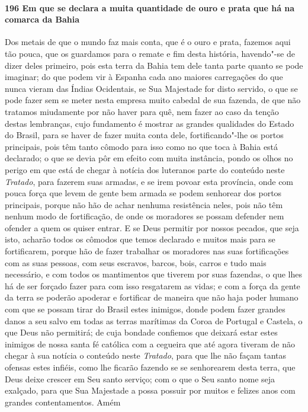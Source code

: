 \begin{linenumbers}
\paragraph{196 Em que se declara a muita quantidade de ouro e prata que há na comarca da
Bahia}\quad
Dos metais de que o mundo faz mais conta, que é o ouro e prata, fazemos aqui tão pouca,
que os guardamos para o remate e fim desta história, havendo"-se de dizer deles primeiro,
pois esta terra da Bahia tem dele tanta parte quanto se pode imaginar; do que podem vir à
Espanha cada ano maiores carregações do que nunca vieram das Índias Ocidentais, se Sua
Majestade for disto servido, o que se pode fazer sem se meter nesta empresa muito cabedal
de sua fazenda, de que não tratamos miudamente por não haver para quê, nem fazer ao caso
da tenção destas lembranças, cujo fundamento é mostrar as grandes qualidades do Estado do
Brasil, para se haver de fazer muita conta dele, fortificando"-lhe os portos principais,
pois têm tanto cômodo para isso como no que toca à Bahia está declarado; o que se devia
pôr em efeito com muita instância, pondo os olhos no perigo em que está de chegar à
notícia dos luteranos parte do conteúdo neste \textit{Tratado}, para fazerem suas armadas,
e se irem povoar esta província, onde com pouca força que levem de gente bem armada se
podem senhorear dos portos principais, porque não hão de achar nenhuma resistência neles,
pois não têm nenhum modo de fortificação, de onde os moradores se possam defender nem
ofender a quem os quiser entrar. E se Deus permitir por nossos pecados, que seja isto,
acharão todos os cômodos que temos declarado e muitos mais para se fortificarem, porque
hão de fazer trabalhar os moradores nas suas fortificações com as suas pessoas, com seus
escravos, barcos, bois, carros e tudo mais necessário, e com todos os mantimentos que
tiverem por suas fazendas, o que lhes há de ser forçado fazer para com isso resgatarem as
vidas; e com a força da gente da terra se poderão apoderar e fortificar de maneira que não
haja poder humano com que se possam tirar do Brasil estes inimigos, donde podem fazer
grandes danos a seu salvo em todas as terras marítimas da Coroa de Portugal e Castela, o
que Deus não permitirá; de cuja bondade confiemos que deixará estar estes inimigos de
nossa santa fé católica com a cegueira que até agora tiveram de não chegar à sua notícia o
conteúdo neste \textit{Tratado}, para que lhe não façam tantas ofensas estes infiéis, como
lhe ficarão fazendo se se senhorearem desta terra, que Deus deixe crescer em Seu santo
serviço; com o que o Seu santo nome seja exalçado, para que Sua Majestade a possa possuir
por muitos e felizes anos com grandes contentamentos. Amém

\end{linenumbers}
